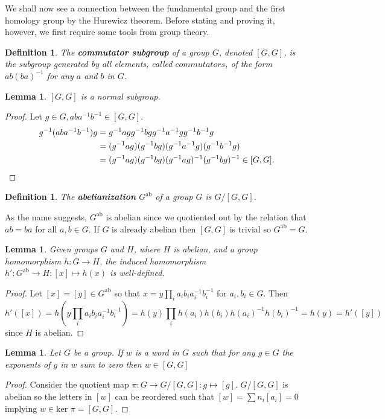 \documentclass{article}
\newtheorem{definition}[theorem]{Definition}
\newtheorem{lemma}[theorem]{Lemma}
\begin{document}
\noindent We shall now see a connection between the fundamental group and the first homology group by the Hurewicz theorem. Before stating and proving it, however, we first require some tools from group theory.

\begin{definition}
The \textbf{commutator subgroup} of a group $G$, denoted $[G,G]$, is the subgroup generated by all elements, called $commutators$, of the form $ab(ba)^{-1}$ for any $a$ and $b$ in $G$.
\end{definition}

\begin{lemma}
$[G,G]$ is a normal subgroup.
\end{lemma}
\begin{proof}
Let $g\in G,aba^{-1}b^{-1}\in [G,G]$.\\
\begin{align*}
g^{-1}(aba^{-1}b^{-1})g&=g^{-1}agg^{-1}bgg^{-1}a^{-1}gg^{-1}b^{-1}g\\&=(g^{-1}ag)(g^{-1}bg)(g^{-1}a^{-1}g)(g^{-1}b^{-1}g)\\&=(g^{-1}ag)(g^{-1}bg)(g^{-1}ag)^{-1}(g^{-1}bg)^{-1}\in[G,G].\qedhere
\end{align*}
\end{proof}
\begin{definition}
The \textbf{abelianization} $G^{\text{ab}}$ of a group $G$ is $G/[G,G]$.
\end{definition}
\noindent As the name suggests, $G^{\text{ab}}$ is abelian since we quotiented out by the relation that $ab=ba$ for all $a,b\in G$. If $G$ is already abelian then $[G,G]$ is trivial so $G^{\text{ab}}=G$.

\begin{lemma}
Given groups $G$ and $H$, where $H$ is abelian, and a group homomorphism $h\colon G\to H$, the induced homomorphism $h'\colon G^{\text{ab}}\to H:[x]\mapsto h(x)$ is well-defined.
\end{lemma}
\begin{proof}
Let $[x]=[y]\in G^{\text{ab}}$ so that $x=y\prod_ia_ib_ia_i^{-1}b_i^{-1}$ for $a_i,b_i\in G$.
Then \[h'([x])=h(y\prod_ia_ib_ia_i^{-1}b_i^{-1})=h(y)\prod_ih(a_i)h(b_i)h(a_i)^{-1}h(b_i)^{-1}=h(y)=h'([y])\] since $H$ is abelian.
\end{proof}

\begin{lemma}
Let $G$ be a group. If $w$ is a word in $G$ such that for any $g\in G$ the exponents of $g$ in $w$ sum to zero then $w\in[G,G]$ 
\end{lemma}
\begin{proof}
Consider the quotient map $\pi\colon G\to G/[G,G]:g\mapsto[g]$.
$G/[G,G]$ is abelian so the letters in $[w]$ can be reordered such that $[w]=\sum n_i[a_i]=0$ implying $w\in\text{ker }\pi=[G,G]$. 
\end{proof}
\end{document}
